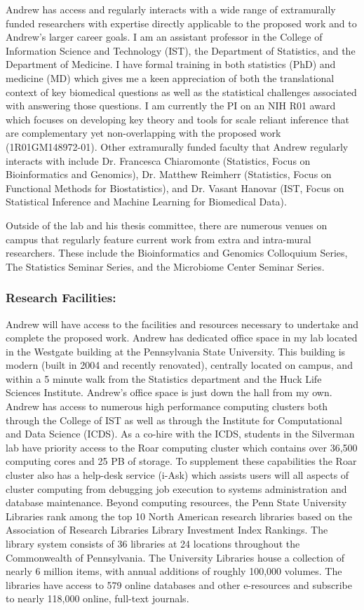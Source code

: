 \documentclass{NIHGrant}
\begin{document}
Andrew has access and regularly interacts with a wide range of extramurally
funded researchers with expertise directly applicable to the proposed work and
to Andrew's larger career goals. I am an assistant professor in the College of
Information Science and Technology (IST), the Department of Statistics, and the
Department of Medicine. I have formal training in both statistics (PhD) and
medicine (MD) which gives me a keen appreciation of both the translational
context of key biomedical questions as well as the statistical challenges
associated with answering those questions. I am currently the PI on an NIH R01
award which focuses on developing key theory and tools for scale reliant
inference that are complementary yet non-overlapping with the proposed work
(1R01GM148972-01). Other extramurally funded faculty that Andrew regularly
interacts with include Dr. Francesca Chiaromonte (Statistics, Focus on
Bioinformatics and Genomics), Dr. Matthew Reimherr (Statistics, Focus on
Functional Methods for Biostatistics), and Dr. Vasant Hanovar (IST, Focus on
Statistical Inference and Machine Learning for Biomedical Data).

Outside of the lab and his thesis committee, there are numerous venues on campus
that regularly feature current work from extra and intra-mural researchers.
These include the Bioinformatics and Genomics Colloquium Series, The Statistics
Seminar Series, and the Microbiome Center Seminar Series. 


\subsubsection*{Research Facilities: }

Andrew will have access to the facilities and resources necessary to undertake
and complete the proposed work. Andrew has dedicated office space in my lab
located in the Westgate building at the Pennsylvania State University. This
building is modern (built in 2004 and recently renovated), centrally located on
campus, and within a 5 minute walk from the Statistics department and the Huck
Life Sciences Institute. Andrew's office space is just down the hall from my
own. Andrew has access to numerous high performance computing clusters both
through the College of IST as well as through the Institute for Computational
and Data Science (ICDS). As a co-hire with the ICDS, students in the Silverman
lab have priority access to the Roar computing cluster which contains over
36,500 computing cores and 25 PB of storage. To supplement these capabilities
the Roar cluster also has a help-desk service (i-Ask) which assists users will
all aspects of cluster computing from debugging job execution to systems
administration and database maintenance. Beyond computing resources, the Penn
State University Libraries rank among the top 10 North American research
libraries based on the Association of Research Libraries Library Investment
Index Rankings. The library system consists of 36 libraries at 24 locations
throughout the Commonwealth of Pennsylvania. The University Libraries house a
collection of nearly 6 million items, with annual additions of roughly 100,000
volumes. The libraries have access to 579 online databases and other e-resources
and subscribe to nearly 118,000 online, full-text journals.
\end{document}
